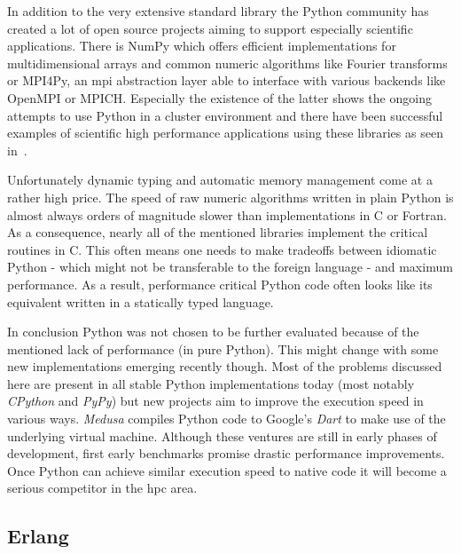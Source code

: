 In addition to the very extensive standard library the Python community has created a lot of open source projects aiming to support especially scientific applications. There is NumPy which offers efficient implementations for multidimensional arrays and common numeric algorithms like Fourier transforms or MPI4Py, an \gls{mpi} abstraction layer able to interface with various backends like OpenMPI or MPICH. Especially the existence of the latter shows the ongoing attempts to use Python in a cluster environment and there have been successful examples of scientific high performance applications using these libraries as seen in~\cite{pyfr}.

Unfortunately dynamic typing and automatic memory management come at a rather high price. The speed of raw numeric algorithms written in plain Python is almost always orders of magnitude slower than implementations in C or Fortran. As a consequence, nearly all of the mentioned libraries implement the critical routines in C. This often means one needs to make tradeoffs between idiomatic Python - which might not be transferable to the foreign language - and maximum performance. As a result, performance critical Python code often looks like its equivalent written in a statically typed language.

In conclusion Python was not chosen to be further evaluated because of the mentioned lack of performance (in pure Python). This might change with some new implementations emerging recently though. Most of the problems discussed here are present in all stable Python implementations today (most notably \textit{CPython} and \textit{PyPy}) but new projects aim to improve the execution speed in various ways. \textit{Medusa} compiles Python code to Google's \textit{Dart} to make use of the underlying virtual machine. Although these ventures are still in early phases of development, first early benchmarks promise drastic performance improvements. Once Python can achieve similar execution speed to native code it will become a serious competitor in the \gls{hpc} area.

\subsection*{Erlang}
\label{subsec:State_of_the_art::Candidates::Erlang}

